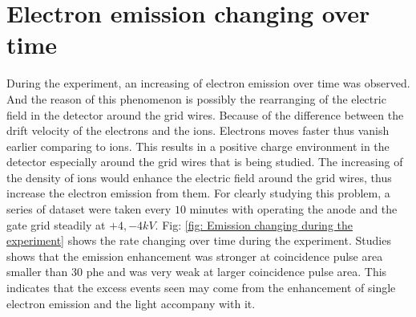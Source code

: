 \section{Electron emission changing over time}
During the experiment, an increasing of electron emission over time was observed. And the reason of this phenomenon is possibly the rearranging of the electric field in the detector around the grid wires. Because of the difference between the drift velocity of the electrons and the ions. Electrons moves faster thus vanish earlier comparing to ions. This results in a positive charge environment in the detector especially around the grid wires that is being studied. The increasing of the density of ions would enhance the electric field around the grid wires, thus increase the electron emission from them.
For clearly studying this problem, a series of dataset were taken every $10$ minutes with operating the anode and the gate grid steadily at $+4,-4kV$. Fig: \ref{fig: Emission changing during the experiment} shows the rate changing over time during the experiment. Studies shows that the emission enhancement was stronger at coincidence pulse area smaller than $30$ phe and was very weak at larger coincidence pulse area. This indicates that the excess events seen may come from the enhancement of single electron emission and the light accompany with it.  
